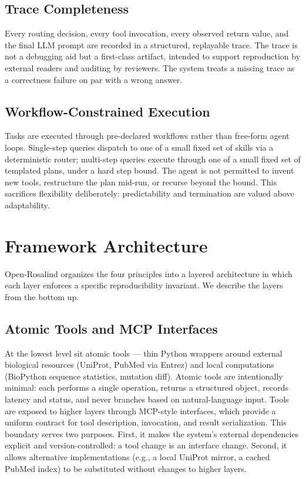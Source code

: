 \documentclass[11pt,letterpaper]{article}
\begin{document}
\subsection{Trace Completeness}
Every routing decision, every tool invocation, every observed return value, and the final LLM prompt are recorded in a structured, replayable trace. The trace is not a debugging aid but a first-class artifact, intended to support reproduction by external readers and auditing by reviewers. The system treats a missing trace as a correctness failure on par with a wrong answer.

\subsection{Workflow-Constrained Execution}
Tasks are executed through pre-declared workflows rather than free-form agent loops. Single-step queries dispatch to one of a small fixed set of skills via a deterministic router; multi-step queries execute through one of a small fixed set of templated plans, under a hard step bound. The agent is not permitted to invent new tools, restructure the plan mid-run, or recurse beyond the bound. This sacrifices flexibility deliberately: predictability and termination are valued above adaptability.

\section{Framework Architecture}
\label{sec:framework}

Open-Rosalind organizes the four principles into a layered architecture in which each layer enforces a specific reproducibility invariant. We describe the layers from the bottom up.

\subsection{Atomic Tools and MCP Interfaces}
\label{sec:tools}
At the lowest level sit atomic tools --- thin Python wrappers around external biological resources (UniProt, PubMed via Entrez) and local computations (BioPython sequence statistics, mutation diff). Atomic tools are intentionally minimal: each performs a single operation, returns a structured object, records latency and status, and never branches based on natural-language input. Tools are exposed to higher layers through MCP-style \cite{anthropic2024mcp} interfaces, which provide a uniform contract for tool description, invocation, and result serialization. This boundary serves two purposes. First, it makes the system's external dependencies explicit and version-controlled: a tool change is an interface change. Second, it allows alternative implementations (e.g., a local UniProt mirror, a cached PubMed index) to be substituted without changes to higher layers.
\end{document}
